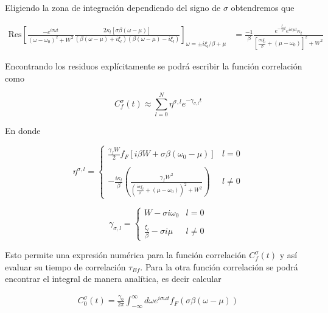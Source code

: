 \begin{appendixs}
Eligiendo la zona de integración dependiendo del signo de $\sigma$ obtendremos que 

\begin{align*}
    \text{Res} \left[ \frac{-e^{i\sigma \omega t}}{(\omega - \omega_{0})^{2} + W^{2} } \frac{ 2\kappa_{l}[\sigma \beta (\omega-\mu)] }{ (\beta(\omega-\mu) + i \xi_{l} )(\beta(\omega-\mu) - i \xi_{l})} \right]_{\omega = \pm i \xi_{l}/\beta + \mu} & = \frac{-1}{\beta} \frac{e^{- \frac{ \xi_{l}}{\beta}t} e^{i\sigma \mu t} \kappa_{l} }{ [ \frac{ \sigma i\xi_{l}}{\beta} + (\mu - \omega_{0}) ]^{2} + W^{2} } 
\end{align*}

Encontrando los residuos explícitamente se podrá escribir la función correlación como

\begin{equation}
    C^{\sigma}_{f}(t) \approx \sum_{l=0}^{N} \eta^{\sigma,l} e^{-\gamma_{\sigma,l} t}
    \label{correlationf}
\end{equation}

En donde 

\begin{equation*}
    \eta^{\sigma,l} = \left\{ \begin{array}{lc} \frac{\gamma_{f}W}{2} f_{F}[i\beta W + \sigma \beta (\omega_{0}-\mu)]  & l = 0 \\ \\ - \frac{i\kappa_{l}}{\beta} \left(\frac{\gamma_{f}W^{2}}{ (\frac{i\sigma \xi_{l}}{\beta} + (\mu-\omega_{0}))^{2} + W^{2} } \right) &  l \neq 0 \end{array} \right.
\end{equation*}

\begin{equation*}
    \gamma_{\sigma,l} =  \left\{ \begin{array}{lc} W- \sigma i \omega_{0}  & l = 0 \\ \\ \frac{\xi_{l}}{\beta} - \sigma i \mu &  l \neq 0 \end{array} \right.
\end{equation*}

Esto permite una expresión numérica para la función correlación $C^{\sigma}_{f}(t)$ y así evaluar su tiempo de correlación $\tau_{Bf}$. Para la otra función correlación se podrá encontrar el integral de manera analítica, es decir calcular

\begin{align*}
       C_{0}^{\sigma}(t) = \frac{\gamma_{0}}{2\pi} \int_{-\infty}^{\infty} d\omega e^{i\sigma \omega t }f_{F}(\sigma \beta (\omega -  \mu))
\end{align*}    


\end{appendixs}
